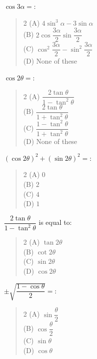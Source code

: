 \documentclass[11pt,a4paper]{article}
\begin{document}
\begin{mcqlist}
\item $\cos3\alpha = $:
\begin{quote}\begin{multicols}{2}
\noindent (A) $4\sin^3\alpha-3\sin\alpha$ \\
(B) $2\cos\dfrac{3\alpha}{2}\sin\dfrac{3\alpha}{2}$ \\
(C) $\cos^2\dfrac{3\alpha}{2}-\sin^2\dfrac{3\alpha}{2}$ \\
(D) None of these
\end{multicols}\end{quote}

\item $\cos2\theta = $:
\begin{quote}\begin{multicols}{2}
\noindent (A) $\dfrac{2\tan\theta}{1-\tan^2\theta}$ \\
(B) $\dfrac{2\tan\theta}{1+\tan^2\theta}$ \\
(C) $\dfrac{1-\tan^2\theta}{1+\tan^2\theta}$ \\
(D) None of these
\end{multicols}\end{quote}

\item $(\cos2\theta)^2+(\sin2\theta)^2 = $:
\begin{quote}\begin{multicols}{2}
\noindent (A) $0$ \\
(B) $2$ \\
(C) $4$ \\
(D) $1$
\end{multicols}\end{quote}

\item $\dfrac{2\tan\theta}{1-\tan^2\theta}$ is equal to:
\begin{quote}\begin{multicols}{2}
\noindent (A) $\tan2\theta$ \\
(B) $\cot2\theta$ \\
(C) $\sin2\theta$ \\
(D) $\cos2\theta$
\end{multicols}\end{quote}

\item $\pm\sqrt{\dfrac{1-\cos\theta}{2}} = $:
\begin{quote}\begin{multicols}{2}
\noindent (A) $\sin\dfrac{\theta}{2}$ \\
(B) $\cos\dfrac{\theta}{2}$ \\
(C) $\sin\theta$ \\
(D) $\cos\theta$
\end{multicols}\end{quote}


\end{mcqlist}
\end{document}
